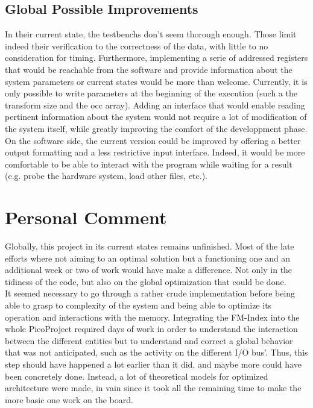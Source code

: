 \subsection{Global Possible Improvements}

In their current state, the testbenchs don't seem thorough enough. Those limit indeed their verification to the correctness of the data, with little to no consideration for timing. Furthermore, implementing a serie of addressed registers that would be reachable from the software and provide information about the system parameters or current states would be more than welcome. Currently, it is only possible to write parameters at the beginning of the execution (such a the transform size and the occ array). Adding an interface that would enable reading pertinent information about the system would not require a lot of modification of the system itself, while greatly improving the comfort of the developpment phase. \\


On the software side, the current version could be improved by offering a better output formatting and a less restrictive input interface. Indeed, it would be more comfortable to be able to interact with the program while waiting for a result (e.g. probe the hardware system, load other files, etc.).


\section{Personal Comment}

Globally, this project in its current states remains unfinished. Most of the late efforts where not aiming to an optimal solution but a functioning one and an additional week or two of work would have make a difference. Not only in the tidiness of the code, but also on the global optimization that could be done. \\

It seemed necessary to go through a rather crude implementation before being able to grasp to complexity of the system and being able to optimize its operation and interactions with the memory. Integrating the FM-Index into the whole PicoProject required days of work in order to understand the interaction between the different entities but to understand and correct a global behavior that was not anticipated, such as the activity on the different I/O bus'. Thus, this step should have happened a lot earlier than it did, and maybe more could have been concretely done. Instead, a lot of theoretical models for optimized architecture were made, in vain since it took all the remaining time to make the more basic one work on the board. \\

